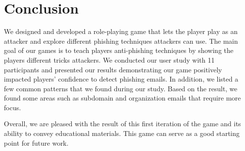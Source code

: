 \section{Conclusion}
We designed and developed a role-playing game that lets the player play as an attacker and explore different phishing techniques attackers can use. The main goal of our games is to teach players anti-phishing techniques by showing the players different tricks attackers. We conducted our user study with 11 participants and presented our results demonstrating our game positively impacted players' confidence to detect phishing emails. In addition, we listed a few common patterns that we found during our study. Based on the result, we found some areas such as subdomain and organization emails that require more focus.

Overall, we are pleased with the result of this first iteration of the game and its ability to convey educational materials. This game can serve as a good starting point for future work.